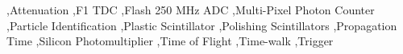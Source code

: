 \begin{keyword}
\gx{} \sep Attenuation \sep F1 TDC \sep Flash 250 MHz ADC \sep Multi-Pixel Photon Counter \sep Particle Identification \sep Plastic Scintillator \sep Polishing Scintillators \sep Propagation Time \sep Silicon Photomultiplier \sep Time of Flight \sep Time-walk \sep Trigger
\end{keyword}